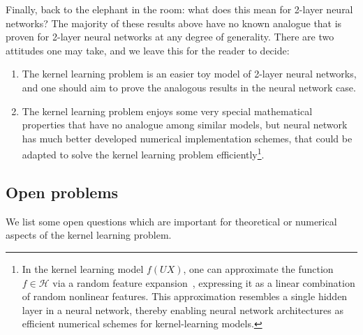 \documentclass[a4paper]{article}
\theoremstyle{definition}
\newcommand{\1}{\mathbbm{1}}
\begin{document}
	
	Finally, back to the elephant in the room: what does this mean for 2-layer neural networks?
	The majority of these results above have no known analogue that is proven for 2-layer neural networks at any degree of generality. There are two attitudes one may take, and we leave this for the reader to decide:
	\begin{enumerate}
		\item The kernel learning problem is an easier toy model of 2-layer neural networks, and one should aim to prove the analogous results in the neural network case.
		
		
		\item The kernel learning problem enjoys some very special mathematical properties that have no analogue among similar models, but neural network has much better developed numerical implementation schemes, that could be adapted to solve the kernel learning problem efficiently\footnote{In the kernel learning model $f(UX)$, one can approximate the function $f\in \mathcal{H}$ via a random feature expansion~\cite{RahimiRecht}, expressing it as a linear combination of random nonlinear features. This approximation resembles a single hidden layer in a neural network, thereby enabling neural network architectures as efficient numerical schemes for kernel-learning models.}. 
		
		
		
		
	\end{enumerate}
	
	
	
	
	
	\subsection*{Open problems}
	
	
	
	
	
	
	
	
	
	We list some open questions which are important for theoretical or numerical aspects of the kernel learning problem.
	
	
	
\end{document}

